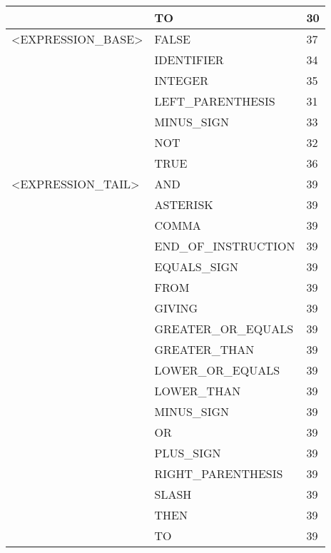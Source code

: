 \begin{longtable}{|l|l|l|}
                     &   TO                   &   30 \\ \hline
<EXPRESSION\_BASE>   &   FALSE                &   37 \\ \hline
                     &   IDENTIFIER           &   34 \\ \hline
                     &   INTEGER              &   35 \\ \hline
                     &   LEFT\_PARENTHESIS     &   31 \\ \hline
                     &   MINUS\_SIGN           &   33 \\ \hline
                     &   NOT                  &   32 \\ \hline
                     &   TRUE                 &   36 \\ \hline
<EXPRESSION\_TAIL>   &   AND                  &   39 \\ \hline
                     &   ASTERISK             &   39 \\ \hline
                     &   COMMA                &   39 \\ \hline
                     &   END\_OF\_INSTRUCTION   &   39 \\ \hline
                     &   EQUALS\_SIGN          &   39 \\ \hline
                     &   FROM                 &   39 \\ \hline
                     &   GIVING               &   39 \\ \hline
                     &   GREATER\_OR\_EQUALS    &   39 \\ \hline
                     &   GREATER\_THAN         &   39 \\ \hline
                     &   LOWER\_OR\_EQUALS      &   39 \\ \hline
                     &   LOWER\_THAN           &   39 \\ \hline
                     &   MINUS\_SIGN           &   39 \\ \hline
                     &   OR                   &   39 \\ \hline
                     &   PLUS\_SIGN            &   39 \\ \hline
                     &   RIGHT\_PARENTHESIS    &   39 \\ \hline
                     &   SLASH                &   39 \\ \hline
                     &   THEN                 &   39 \\ \hline
                     &   TO                   &   39 \\ \hline

\end{longtable}
